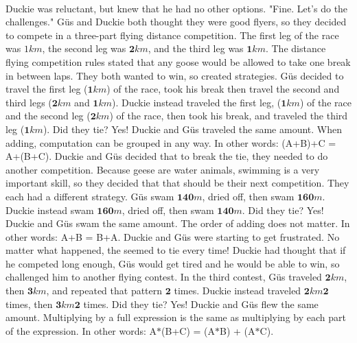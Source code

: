 \paragraph{} Duckie was reluctant, but knew that he had no other options. "Fine. Let's do the challenges."
\pagebreak
{}
{Güs and Duckie both thought they were good flyers, so they decided to compete in a three-part flying distance competition. The first leg of the race was $1 km$, the second leg was $\mathbf{2} km$, and the third leg was $\mathbf{1} km$. The distance flying competition rules stated that any goose would be allowed to take one break in between laps. They both wanted to win, so created strategies. Güs decided to travel the first leg ($\mathbf{1} km$) of the race, took his break then travel the second and third legs ($\mathbf{2} km$ and $\mathbf{1} km$). Duckie instead traveled the first leg, ($\mathbf{1} km$) of the race and the second leg ($\mathbf{2} km$) of the race, then took his break, and traveled the third leg ($\mathbf{1} km$). Did they tie?}
{Yes! Duckie and Güs traveled the same amount.}
{When adding, computation can be grouped in any way. In other words: (A+B)+C = A+(B+C).}
{}
{Duckie and Güs decided that to break the tie, they needed to do another competition. \linebreak Because geese are water animals, swimming is a very important skill, so they decided that that should be their next competition. They each had a different strategy. Güs swam $\mathbf{140} m$, dried off, then swam $\mathbf{160} m$. Duckie instead swam $\mathbf{160} m$, dried off, then swam $\mathbf{140} m$. Did they tie?}
{Yes! Duckie and Güs swam the same amount.}
{The order of adding does not matter. In other words: A+B = B+A.}
{}
{Duckie and Güs were starting to get frustrated. No matter what happened, the seemed to tie every time! Duckie had thought that if he competed long enough, Güs would get tired and he would be able to win, so challenged him to another flying contest. In the third contest, Güs traveled $\mathbf{2} km$, then $\mathbf{3} km$, and repeated that pattern $\mathbf{2}$ times. Duckie instead traveled $\mathbf{2} km  \mathbf{2}$ times, then $\mathbf{3} km  \mathbf{2}$ times. Did they tie?}
{Yes! Duckie and Güs flew the same amount.}
{Multiplying by a full expression is the same as multiplying by each part of the expression. In other words: A$\ast$(B+C) = (A$\ast$B) + (A$\ast$C).}
